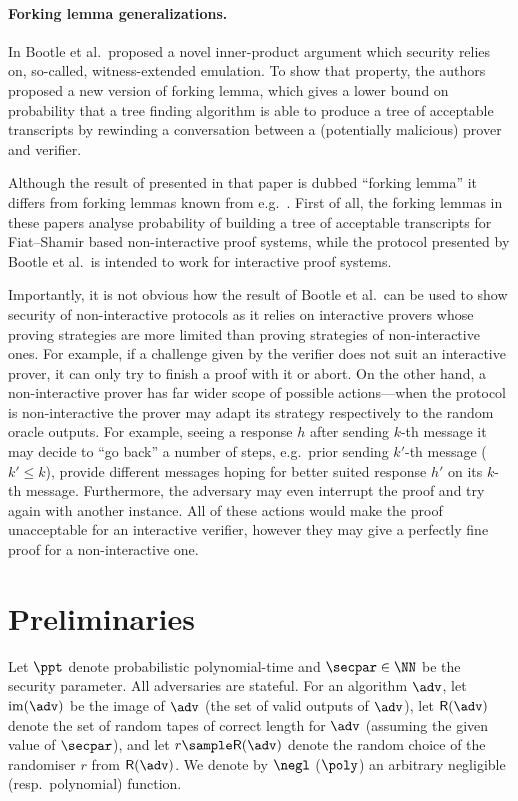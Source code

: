 \documentclass[runningheads,11pt]{llncs}
\begin{document}
\paragraph{Forking lemma generalizations.}
In \cite{EC:BCCGP16} Bootle et al.~proposed a novel inner-product argument which
security relies on, so-called, witness-extended emulation. To show that
property, the authors proposed a new version of forking lemma, which gives a
lower bound on probability that a tree finding algorithm is able to produce a 
tree of acceptable transcripts by rewinding a conversation between a
(potentially malicious) prover and verifier.

Although the result of presented in that paper is dubbed ``forking lemma'' it
differs from forking lemmas known from e.g.~\cite{JC:PoiSte00,CCS:BelNev06}.
First of all, the forking lemmas in these papers analyse probability of building
a tree of acceptable transcripts for Fiat--Shamir based non-interactive proof
systems, while the protocol presented by Bootle et al.~is intended to work for
interactive proof systems.

Importantly, it is not obvious how the result of Bootle et al.~can be used to
show security of non-interactive protocols as it relies on interactive provers
whose proving strategies are more limited than proving strategies of
non-interactive ones. For example, if a challenge given by the verifier does not
suit an interactive prover, it can only try to finish a proof with it or
abort. On the other hand, a non-interactive prover has far wider scope of
possible actions---when the protocol is non-interactive the prover may
adapt its strategy respectively to the random oracle outputs. For example,
seeing a response $h$ after sending $k$-th message it may decide to ``go back''
a number of steps, e.g.~prior sending $k'$-th message ($k' \leq k$), provide
different messages hoping for better suited response $h'$ on its $k$-th
message. Furthermore, the adversary may even interrupt the proof and try again
with another instance. All of these actions would make the proof unacceptable
for an interactive verifier, however they may give a perfectly fine proof for a
non-interactive one.

\section{Preliminaries}
\label{sec:preliminaries}
Let $\ppt$ denote probabilistic polynomial-time and $\secpar \in \NN$ be the
security parameter. All adversaries are stateful. For an algorithm $\adv$, let
$\image (\adv)$ be the image of $\adv$ (the set of valid outputs of $\adv$), let
$\RND{\adv}$ denote the set of random tapes of correct length for $\adv$
(assuming the given value of $\secpar$), and let $r \sample \RND{\adv}$ denote
the random choice of the randomiser $r$ from $\RND{\adv}$. We denote by $\negl$
($\poly$) an arbitrary negligible (resp.~polynomial) function.
\end{document}

